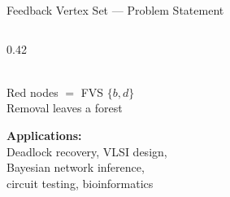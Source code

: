 \documentclass[aspectratio=169,10pt]{beamer}
\renewcommand{\footnotesize}{\tiny}
\begin{document}
\begin{frame}{Feedback Vertex Set — Problem Statement}
\begin{columns}[T]
\begin{column}{0.42\textwidth}
\begin{center}
\\[4pt]
        {\small\color{alertred}Red nodes $= $ FVS $\{b,d\}$}\\[2pt]
        {\tiny Removal leaves a forest}
      \end{center}
      \vspace{6pt}
      \begin{tcolorbox}[greenbox,fontupper=\footnotesize]
        \textbf{Applications:}\\
        Deadlock recovery, VLSI design,\\
        Bayesian network inference,\\
        circuit testing, bioinformatics
      \end{tcolorbox}
    \end{column}
  \end{columns}
\end{frame}
\end{document}
